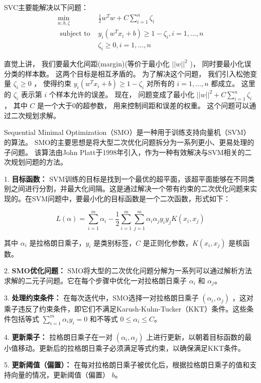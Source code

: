 \documentclass[lang=cn,a4paper]{shu-lab-report}
\begin{document}
SVC主要能解决以下问题：
$$
\begin{array}{ll}
    \min_{w, b, \zeta} & \frac{1}{2} w^T w + C \sum_{i=1}^n \zeta_i \\
    \text { subject to } & y_i (w^T x_i + b) \geq 1 - \zeta_i, i = 1, ..., n \\
    & \zeta_i \geq 0, i = 1, ..., n
\end{array}
$$

直觉上讲， 我们要最大化间距(margin)(等价于最小化 $||w||^2$ )， 同时要最小化误分类的样本数。
这两个目标是相互矛盾的。 为了解决这个问题， 我们引入松弛变量 $\zeta_i \geq 0$ ，
使得约束 $y_i (w^T x_i + b) \geq 1 - \zeta_i$ 对所有的 $i = 1, ..., n$ 都成立。
这里的 $\zeta_i$ 表示第 $i$ 个样本允许的误差。 现在， 问题变成了最小化 $||w||^2 + C \sum_{i=1}^n \zeta_i$ ，
其中 $C$ 是一个大于0的超参数， 用来控制间距和误差的权重。 这个问题可以通过二次规划求解。

Sequential Minimal Optimization（SMO）是一种用于训练支持向量机（SVM）的算法。
SMO的主要思想是将大型二次优化问题拆分为一系列更小、更易处理的子问题。
该算法由John Platt于1998年引入，作为一种有效解决与SVM相关的二次规划问题的方法。

1. \textbf{目标函数：}
   SVM训练的目标是找到一个最优的超平面，该超平面能够在不同类别之间进行分割，并最大化间隔。这是通过解决一个带有约束的二次优化问题来实现的。在SVM问题中，要最小化的目标函数是一个二次函数，形式如下：

   \[L(\alpha) = \sum_{i=1}^{m} \alpha_i - \frac{1}{2} \sum_{i=1}^{m}\sum_{j=1}^{m} \alpha_i \alpha_j y_i y_j K(x_i, x_j)\]

   其中 \(\alpha_i\) 是拉格朗日乘子，\(y_i\) 是类别标签，\(C\) 是正则化参数，\(K(x_i, x_j)\) 是核函数。

2. \textbf{SMO优化问题：}
   SMO将大型的二次优化问题分解为一系列可以通过解析方法求解的二元子问题。它在每个步骤中优化一对拉格朗日乘子 \(\alpha_i\) 和 \(\alpha_j\)。

3. \textbf{处理约束条件：}
   在每次迭代中，SMO选择一对拉格朗日乘子 \((\alpha_i, \alpha_j)\) ，这对乘子违反了约束条件，即它们不满足Karush-Kuhn-Tucker（KKT）条件。这些条件包括等式 \(\sum_{i=1}^{m} \alpha_i y_i = 0\) 和不等式 \(0 \leq \alpha_i \leq C\)。

4. \textbf{更新乘子：}
   拉格朗日乘子在一对 \((\alpha_i, \alpha_j)\) 上进行更新，以朝着目标函数的最小值移动。更新后的拉格朗日乘子必须满足等式约束，以确保满足KKT条件。

5. \textbf{更新阈值（偏置）：}
   在每对拉格朗日乘子被优化后，根据拉格朗日乘子的值和支持向量的情况，更新阈值（偏置） \(b\)。
\end{document}

